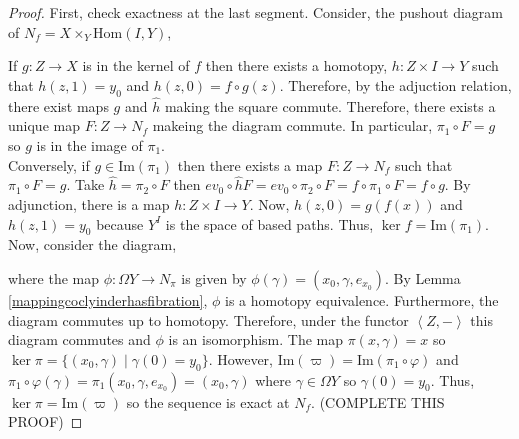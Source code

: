 \documentclass[12pt]{extarticle}
\newcommand{\Hom}[2]{\mathrm{Hom}\left( #1, #2 \right)}
\renewcommand{\Im}[1]{\mathrm{Im}(#1)}
\theoremstyle{definition}
\begin{document}
\begin{proof}
First, check exactness at the last segment. Consider, the pushout diagram of $N_f = X \times_Y \Hom{I}{Y}$,
 \begin{center}
\end{center} 
If $g : Z \to X$ is in the kernel of $f$ then there exists a homotopy, $h : Z \times I \to Y$ such that $h(z, 1) = y_0$ and $h(z, 0) = f \circ g(z)$. Therefore, by the adjuction relation, there exist maps $g$ and $\hat{h}$ making the square commute. Therefore, there exists a unique map $F : Z \to N_f$ makeing the diagram commute. In particular, $\pi_1 \circ F = g$ so $g$ is in the image of $\pi_1$.\bigskip \\
Conversely, if $g \in \Im{\pi_1}$ then there exists a map $F : Z \to N_f$ such that $\pi_1 \circ F = g$. Take $\hat{h} = \pi_2 \circ F$ then $ev_0 \circ \hat{h} F = ev_0 \circ \pi_2 \circ F = f \circ \pi_1 \circ F = f \circ g$. By adjunction, there is a map $h : Z \times I \to Y$. Now, $h(z,0) = g(f(x))$ and $h(z, 1) = y_0$ because $Y^I$ is the space of based paths. Thus, $\ker{f} = \Im{\pi_1}$. \bigskip \\
Now, consider the diagram, 
\begin{center}
\end{center}   
where the map $\phi : \Omega Y \to N_\pi$ is given by $\phi(\gamma) = (x_0, \gamma, e_{x_0})$. By Lemma \ref{mappingcoclyinderhasfibration}, $\phi$ is a homotopy equivalence. Furthermore, the diagram commutes up to homotopy. Therefore, under the functor $\left< Z, - \right>$ this diagram commutes and $\phi$ is an isomorphism. The map $\pi(x, \gamma) = x$ so $\ker{\pi} = \{(x_0, \gamma) \mid \gamma(0) = y_0\}$. However, $\Im{\varpi} = \Im{\pi_1 \circ \varphi}$ and $\pi_1 \circ \varphi(\gamma) = \pi_1(x_0, \gamma, e_{x_0}) = (x_0, \gamma)$ where $\gamma \in \Omega Y$ so $\gamma(0) = y_0$. Thus, $\ker{\pi} = \Im{\varpi}$ so the sequence is exact at $N_f$. (COMPLETE THIS PROOF) 
\end{proof}
\end{document}
